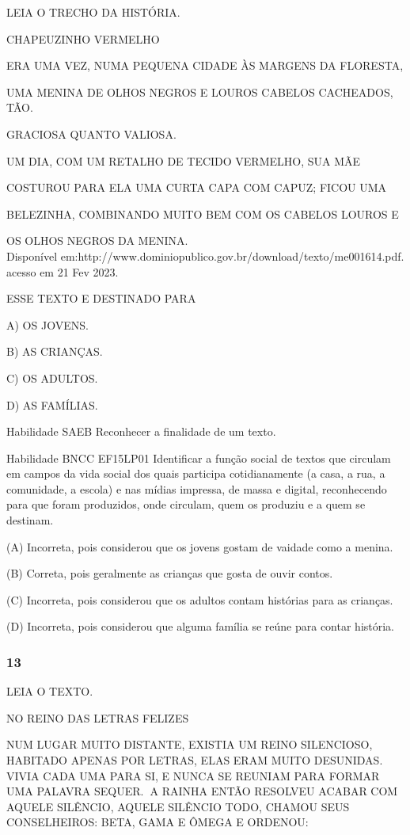 \begin{escola}
LEIA O TRECHO DA HISTÓRIA.

CHAPEUZINHO VERMELHO

ERA UMA VEZ, NUMA PEQUENA CIDADE ÀS MARGENS DA FLORESTA,

UMA MENINA DE OLHOS NEGROS E LOUROS CABELOS CACHEADOS, TÃO.

GRACIOSA QUANTO VALIOSA.

UM DIA, COM UM RETALHO DE TECIDO VERMELHO, SUA MÃE

COSTUROU PARA ELA UMA CURTA CAPA COM CAPUZ; FICOU UMA

BELEZINHA, COMBINANDO MUITO BEM COM OS CABELOS LOUROS E

OS OLHOS NEGROS DA MENINA.\\
Disponível
em:http://www.dominiopublico.gov.br/download/texto/me001614.pdf. acesso
em 21 Fev 2023.

ESSE TEXTO E DESTINADO PARA

A) OS JOVENS.

B) AS CRIANÇAS.

C) OS ADULTOS.

D) AS FAMÍLIAS.

Habilidade SAEB Reconhecer a finalidade de um texto.

Habilidade BNCC EF15LP01 Identificar a função social de textos que
circulam em campos da vida social dos quais participa cotidianamente (a
casa, a rua, a comunidade, a escola) e nas mídias impressa, de massa e
digital, reconhecendo para que foram produzidos, onde circulam, quem os
produziu e a quem se destinam.

(A) Incorreta, pois considerou que os jovens gostam de vaidade como a
menina.

(B) Correta, pois geralmente as crianças que gosta de ouvir contos.

(C) Incorreta, pois considerou que os adultos contam histórias para as
crianças.

(D) Incorreta, pois considerou que alguma família se reúne para contar
história.

\subsubsection{13}\label{section-85}

LEIA O TEXTO.

NO REINO DAS LETRAS FELIZES

NUM LUGAR MUITO DISTANTE, EXISTIA UM REINO SILENCIOSO, HABITADO APENAS
POR LETRAS, ELAS ERAM MUITO DESUNIDAS. VIVIA CADA UMA PARA SI, E NUNCA
SE REUNIAM PARA FORMAR UMA PALAVRA SEQUER.\textbf{~}A RAINHA ENTÃO
RESOLVEU ACABAR COM AQUELE SILÊNCIO, AQUELE SILÊNCIO TODO, CHAMOU SEUS
CONSELHEIROS: BETA, GAMA E ÔMEGA E ORDENOU:


\end{escola}
